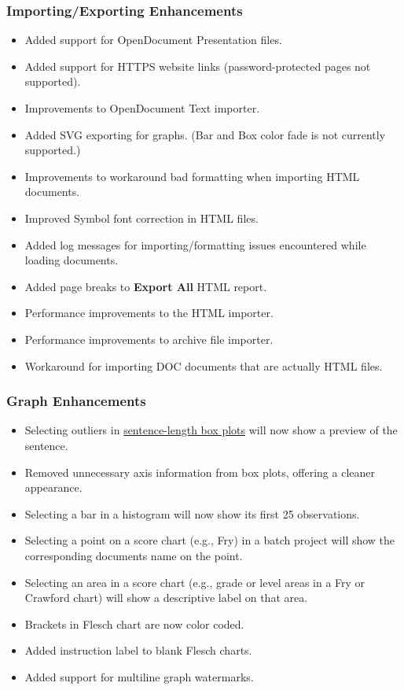 \documentclass[
]{book}
\providecommand{\tightlist}{%
  \setlength{\itemsep}{0pt}\setlength{\parskip}{0pt}}
\theoremstyle{definition}
\theoremstyle{definition}
\theoremstyle{definition}
\theoremstyle{definition}
\theoremstyle{remark}
\begin{document}
\hypertarget{importingexporting-enhancements-1}{%
\subsubsection*{Importing/Exporting Enhancements}\label{importingexporting-enhancements-1}}

\begin{itemize}
\tightlist
\item
  Added support for OpenDocument Presentation files.
\item
  Added support for HTTPS website links (password-protected pages not supported).
\item
  Improvements to OpenDocument Text importer.
\item
  Added SVG exporting for graphs. (Bar and Box color fade is not currently supported.)
\item
  Improvements to workaround bad formatting when importing HTML documents.
\item
  Improved Symbol font correction in HTML files.
\item
  Added log messages for importing/formatting issues encountered while loading documents.
\item
  Added page breaks to \textbf{Export All} HTML report.
\item
  Performance improvements to the HTML importer.
\item
  Performance improvements to archive file importer.
\item
  Workaround for importing DOC documents that are actually HTML files.
\end{itemize}

\hypertarget{graph-enhancements-1}{%
\subsubsection*{Graph Enhancements}\label{graph-enhancements-1}}

\begin{itemize}
\tightlist
\item
  Selecting outliers in \protect\hyperlink{reviewing-sentences-breakdown}{sentence-length box plots} will now show a preview of the sentence.
\item
  Removed unnecessary axis information from box plots, offering a cleaner appearance.
\item
  Selecting a bar in a histogram will now show its first 25 observations.
\item
  Selecting a point on a score chart (e.g., Fry) in a batch project will show the corresponding documents name on the point.
\item
  Selecting an area in a score chart (e.g., grade or level areas in a Fry or Crawford chart) will show a descriptive label on that area.
\item
  Brackets in Flesch chart are now color coded.
\item
  Added instruction label to blank Flesch charts.
\item
  Added support for multiline graph watermarks.
\end{itemize}
\end{document}
